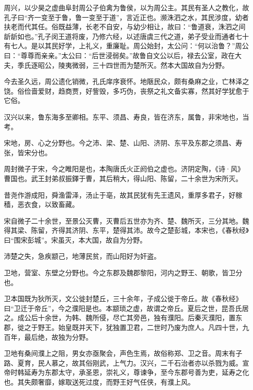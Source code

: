 \documentclass[12pt,UTF8]{ctexbook}
\begin{document}
周兴，以少昊之虚曲阜封周公子伯禽为鲁侯，以为周公主。其民有圣人之教化，故孔子曰“齐一变至于鲁，鲁一变至于道”，言近正也。濒洙泗之水，其民涉度，幼者扶老而代其任。俗既益薄，长老不自安，与幼少相让，故曰：“鲁道衰，洙泗之间龂龂如也。”孔子闵王道将废，乃修六经，以述唐虞三代之道，弟子受业而通者七十有七人。是以其民好学，上礼义，重廉耻。周公始封，太公问：“何以治鲁？”周公曰：“尊尊而亲亲。”太公曰：“后世浸弱矣。”故鲁自文公以后，禄去公室，政在大夫，季氏逐昭公，陵夷微弱，三十四世而为楚所灭。然本大国故自为分野。



今去圣久远，周公遗化销微，孔氏庠序衰怀。地陿民众，颇有桑麻之业，亡林泽之饶。俗俭啬爱财，趋商贾，好訾毁，多巧伪，丧祭之礼文备实寡，然其好学犹愈于它俗。



汉兴以来，鲁东海多至卿相。东平、须昌、寿良，皆在济东，属鲁，非宋地也，当考。



宋地，房、心之分野也。今之沛、梁、楚、山阳、济阴、东平及东郡之须昌、寿张，皆宋分也。



周封微子于宋，今之睢阳是也，本陶唐氏火正阏伯之虚也。济阴定陶，《诗·风》曹国也。武王封弟叔振鐸于曹，其后稍大，得山阳、陈留，二十余世为宋所灭。



昔尧作游成阳，舜渔雷泽，汤止于亳，故其民犹有先王遗风，重厚多君子，好稼穑，恶衣食，以致畜藏。



宋自微子二十余世，至景公灭曹，灭曹后五世亦为齐、楚、魏所灭，三分其地。魏得其梁、陈留，齐得其济阴、东平，楚得其沛。故今之楚彭城，本宋也，《春秋经》曰“围宋彭城”。宋虽灭，本大国，故自为分野。



沛楚之失，急疾颛己，地薄民贫，而山阳好为奸盗。



卫地，营室、东壁之分野也。今之东郡及魏郡黎阳，河内之野王、朝歌，皆卫分也。



卫本国既为狄所灭，文公徙封楚丘，三十余年，子成公徙于帝丘。故《春秋经》曰“卫迁于帝丘”，今之濮阳是也。本颛琐之虚，故谓之帝丘。夏后之世，昆吾氏居之。成公后十余世，为韩、魏所侵，尽亡其旁邑，独有濮阳。后秦灭濮阳，置东郡，徙之于野王。始皇既并天下，犹独置卫君，二世时乃废为庶人。凡四十世，九百年，最后绝，故独为分野。



卫地有桑间濮上之阻，男女亦亟聚会，声色生焉，故俗称郑、卫之音。周末有子路、夏育，民人慕之，故其俗刚武，上气力。汉兴，二千石治者亦以杀戮为威。宣帝时韩延寿为东郡太守，承圣恩，崇礼义，尊谏争，至今东郡号善为吏，延寿之化也。其失颇奢靡，嫁取送死过度，而野王好气任侠，有濮上风。
\end{document}
